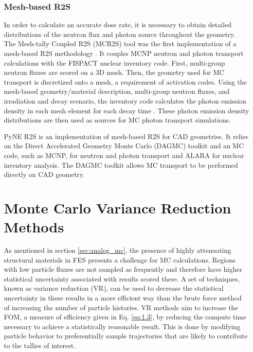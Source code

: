 \subsubsection{Mesh-based R2S}
In order to calculate an accurate dose rate, it is necessary to obtain
detailed distributions of the neutron flux and photon source
throughout the geometry.
The Mesh-tally Coupled R2S (MCR2S) tool was the first implementation of a mesh-based R2S methodology
\cite{mcr2s}.  It couples MCNP neutron and photon transport calculations with
the FISPACT nuclear inventory code. First, multi-group neutron fluxes are
scored on a 3D mesh.
Then, the geometry used for MC
transport is discretized onto a mesh, a requirement of activation codes.  Using
the mesh-based geometry/material description,
multi-group neutron fluxes, and irradiation and decay scenario, the inventory code
calculates the photon emission density in each mesh element for each decay time
\cite{mcr2s}.  These photon emission density distributions are then used as
sources for MC photon transport simulations.  

PyNE R2S \cite{mesh_r2s} is an implementation of mesh-based R2S for CAD
geometries.  It relies on the Direct Accelerated Geometry Monte Carlo (DAGMC) toolkit and an MC
code, such as MCNP, for neutron and
photon transport and ALARA \cite{alara} for nuclear inventory analysis.  
The DAGMC toolkit allows MC transport to be performed directly on CAD geometry.

\section{Monte Carlo Variance Reduction Methods}\label{sec:vr_methods}

As mentioned in section \ref{sec:analog_mc}, the presence of highly attenuating
structural materials in 
FES presents a challenge for MC calculations.
Regions with low particle fluxes are not sampled as frequently and therefore
have higher statistical uncertainty associated with results scored there.
A set of techniques, known as variance reduction (VR), can be used to decrease
the statistical uncertainty in these results in a more efficient way than the
brute force method of increasing the number of particle histories.
VR methods aim to increase the FOM, a measure of efficiency given
in Eq. \ref{eq:1.3}, by reducing the compute time 
necessary to achieve a statistically reasonable result.
This is done by modifying particle behavior to preferentially sample trajectories that are likely to
contribute to the tallies of interest.

